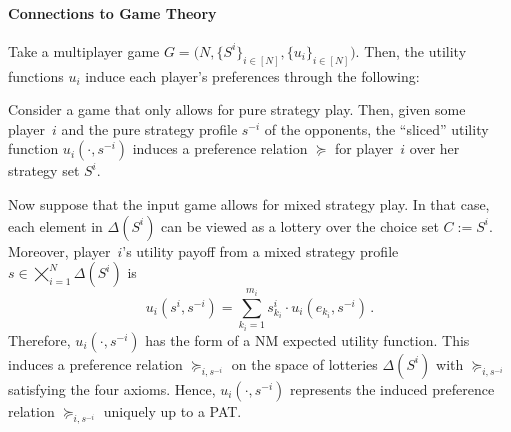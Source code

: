 \paragraph{Connections to Game Theory} Take a multiplayer game $G = \big( N, \{S^i\}_{i \in [N]}, \{u_i\}_{i \in [N]} \big)$. Then, the utility functions $u_i$ induce each player's preferences through the following:

Consider a game that only allows for pure strategy play. Then, given some player~$i$ and the pure strategy profile $s^{-i}$ of the opponents, the ``sliced'' utility function $u_i(\cdot, s^{-i})$ induces a preference relation $\succeq$ for player~$i$ over her strategy set $S^i$.

Now suppose that the input game allows for mixed strategy play. In that case, each element in $\Delta(S^i)$ can be viewed as a lottery over the choice set $C := S^i$. Moreover, player~$i$'s utility payoff from a mixed strategy profile $\displaystyle s \in \bigtimes_{i=1}^N \Delta(S^i)$ is
\[u_i(s^i, s^{-i}) = \sum_{k_i=1}^{m_i} s_{k_i}^i \cdot u_i(e_{k_i}, s^{-i}) \, . \]
Therefore, $u_i(\cdot, s^{-i})$ has the form of a NM expected utility function. This induces a preference relation $\succeq_{i, s^{-i}}$ on the space of lotteries $\Delta(S^i)$ with $\succeq_{i, s^{-i}}$ satisfying the four axioms. Hence, $u_i(\cdot, s^{-i})$ represents the induced preference relation $\succeq_{i, s^{-i}}$ uniquely up to a PAT.

